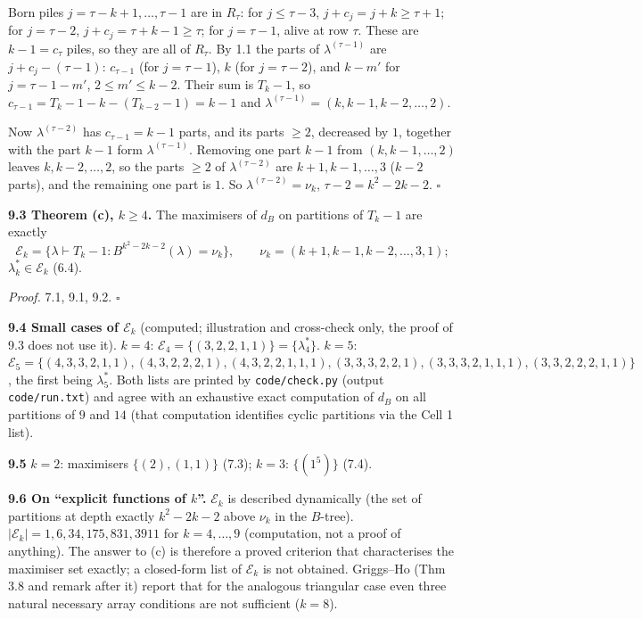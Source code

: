 \documentclass[11pt]{article}
\begin{document}
Born piles $j=\tau-k+1,\dots,\tau-1$ are in $R_\tau$: for $j\le\tau-3$, $j+c_j=j+k\ge\tau+1$; for $j=\tau-2$, $j+c_j=\tau+k-1\ge\tau$; for $j=\tau-1$, alive at row $\tau$. These are $k-1=c_\tau$ piles, so they are all of $R_\tau$. By 1.1 the parts of $\lambda^{(\tau-1)}$ are $j+c_j-(\tau-1)$: $c_{\tau-1}$ (for $j=\tau-1$), $k$ (for $j=\tau-2$), and $k-m'$ for $j=\tau-1-m'$, $2\le m'\le k-2$. Their sum is $T_k-1$, so $c_{\tau-1}=T_k-1-k-(T_{k-2}-1)=k-1$ and $\lambda^{(\tau-1)}=(k,k-1,k-2,\dots,2)$.

Now $\lambda^{(\tau-2)}$ has $c_{\tau-1}=k-1$ parts, and its parts $\ge2$, decreased by $1$, together with the part $k-1$ form $\lambda^{(\tau-1)}$. Removing one part $k-1$ from $(k,k-1,\dots,2)$ leaves $k,k-2,\dots,2$, so the parts $\ge2$ of $\lambda^{(\tau-2)}$ are $k+1,k-1,\dots,3$ ($k-2$ parts), and the remaining one part is $1$. So $\lambda^{(\tau-2)}=\nu_k$, $\tau-2=k^2-2k-2$. $\square$

\textbf{9.3 Theorem (c), $k\ge4$.} The maximisers of $d_B$ on partitions of $T_k-1$ are exactly
\[
\mathcal E_k=\{\lambda\vdash T_k-1:B^{k^2-2k-2}(\lambda)=\nu_k\},\qquad \nu_k=(k+1,k-1,k-2,\dots,3,1);
\]
$\lambda^*_k\in\mathcal E_k$ (6.4).

\emph{Proof.} 7.1, 9.1, 9.2. $\square$

\textbf{9.4 Small cases of $\mathcal E_k$} (computed; illustration and cross-check only, the proof of 9.3 does not use it). $k=4$: $\mathcal E_4=\{(3,2,2,1,1)\}=\{\lambda^*_4\}$. $k=5$: $\mathcal E_5=\{(4,3,3,2,1,1),(4,3,2,2,2,1),(4,3,2,2,1,1,1),(3,3,3,2,2,1),(3,3,3,2,1,1,1),(3,3,2,2,2,1,1)\}$, the first being $\lambda^*_5$. Both lists are printed by \texttt{code/check.py} (output \texttt{code/run.txt}) and agree with an exhaustive exact computation of $d_B$ on all partitions of $9$ and $14$ (that computation identifies cyclic partitions via the Cell 1 list).

\textbf{9.5} $k=2$: maximisers $\{(2),(1,1)\}$ (7.3); $k=3$: $\{(1^5)\}$ (7.4).

\textbf{9.6 On ``explicit functions of $k$''.} $\mathcal E_k$ is described dynamically (the set of partitions at depth exactly $k^2-2k-2$ above $\nu_k$ in the $B$-tree). $|\mathcal E_k|=1,6,34,175,831,3911$ for $k=4,\dots,9$ (computation, not a proof of anything). The answer to (c) is therefore a proved criterion that characterises the maximiser set exactly; a closed-form list of $\mathcal E_k$ is not obtained. Griggs--Ho (Thm 3.8 and remark after it) report that for the analogous triangular case even three natural necessary array conditions are not sufficient ($k=8$).
\end{document}

